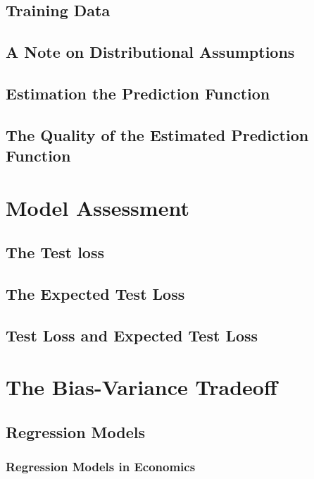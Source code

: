 \documentclass[11pt,a4paper]{article}
\begin{document}
\subsection{Training Data}

\subsection{A Note on Distributional Assumptions}

\subsection{Estimation the Prediction Function}

\subsection{The Quality of the Estimated Prediction Function}

\section{Model Assessment}


\subsection{The Test loss}

\subsection{The Expected Test Loss}

\subsection{Test Loss and Expected Test Loss}

\section{The Bias-Variance Tradeoff}

\subsection{Regression Models}

\subsubsection{Regression Models in Economics}
\end{document}
